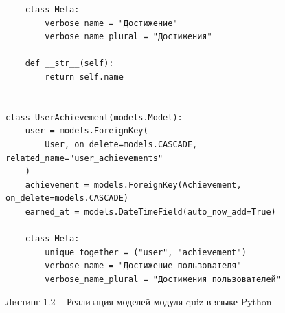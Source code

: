 \documentclass[14pt,a4paper]{extreport}
\begin{document}
\begin{lstlisting}
    class Meta:
        verbose_name = "Достижение"
        verbose_name_plural = "Достижения"

    def __str__(self):
        return self.name


class UserAchievement(models.Model):
    user = models.ForeignKey(
        User, on_delete=models.CASCADE, related_name="user_achievements"
    )
    achievement = models.ForeignKey(Achievement, on_delete=models.CASCADE)
    earned_at = models.DateTimeField(auto_now_add=True)

    class Meta:
        unique_together = ("user", "achievement")
        verbose_name = "Достижение пользователя"
        verbose_name_plural = "Достижения пользователей"
\end{lstlisting}

\newpage

\begin{flushright}
Листинг 1.2 -- Реализация моделей модуля quiz в языке Python
\end{flushright}
\end{document}
